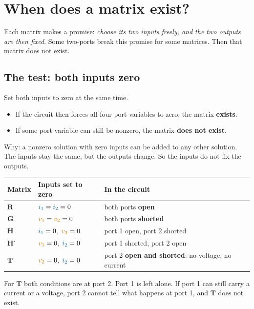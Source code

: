 \documentclass[11pt,a4paper]{article}
\newcommand{\Icol}[1]{\textcolor{ccur}{#1}}
\newcommand{\Vcol}[1]{\textcolor{cvolt}{#1}}
\newcommand{\vone}{\Vcol{v_1}}  \newcommand{\vtwo}{\Vcol{v_2}}
\newcommand{\ione}{\Icol{i_1}}  \newcommand{\itwo}{\Icol{i_2}}
\newcommand{\Rm}{\mathbf{R}}  \newcommand{\Gm}{\mathbf{G}}
\newcommand{\Hm}{\mathbf{H}}  \newcommand{\Tm}{\mathbf{T}}
\begin{document}
\section{When does a matrix exist?}\label{sec:exist}

Each matrix makes a promise: \emph{choose its two inputs freely, and the two outputs are then
fixed}. Some two-ports break this promise for some matrices. Then that matrix does not exist.

\subsection{The test: both inputs zero}

Set both inputs to zero at the same time.
\begin{itemize}[itemsep=3pt]
  \item If the circuit then forces all four port variables to zero, the matrix \textbf{exists}.
  \item If some port variable can still be nonzero, the matrix \textbf{does not exist}.
\end{itemize}
Why: a nonzero solution with zero inputs can be added to any other solution. The inputs stay
the same, but the outputs change. So the inputs do not fix the outputs.

\begin{center}
\small
\renewcommand{\arraystretch}{1.35}
\begin{tabular}{@{}l l l@{}}
\toprule
\textbf{Matrix} & \textbf{Inputs set to zero} & \textbf{In the circuit}\\
\midrule
$\Rm$ & $\ione = \itwo = 0$ & both ports \textbf{open}\\
$\Gm$ & $\vone = \vtwo = 0$ & both ports \textbf{shorted}\\
$\Hm$ & $\ione = 0$, $\vtwo = 0$ & port 1 open, port 2 shorted\\
$\Hm'$ & $\vone = 0$, $\itwo = 0$ & port 1 shorted, port 2 open\\
$\Tm$ & $\vtwo = 0$, $\itwo = 0$ & port 2 \textbf{open and shorted}: no voltage, no current\\
\bottomrule
\end{tabular}
\end{center}
For $\Tm$ both conditions are at port 2. Port 1 is left alone. If port 1 can still carry a
current or a voltage, port 2 cannot tell what happens at port 1, and $\Tm$ does not exist.
\end{document}
